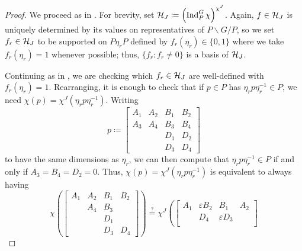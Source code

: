 \begin{proof}
	We proceed as in . For brevity, set $\mathcal{H}_J\coloneqq\left(\operatorname{Ind}_P^G\chi\right)^{\chi^J}$. Again, $f\in\mathcal{H}_J$ is uniquely determined by its values on representatives of $P\backslash G/P$, so we set $f_r\in\mathcal{H}_J$ to be supported on $P\eta_rP$ defined by $f_r(\eta_r)\in\{0,1\}$ where we take $f_r(\eta_r)=1$ whenever possible; thus, $\{f_r:f_r\ne0\}$ is a basis of $\mathcal{H}_J$.

	Continuing as in , we are checking which $f_r\in\mathcal{H}_J$ are well-defined with $f_r(\eta_r)=1$.
    Rearranging, it is enough to check that
    if $p\in P$ has $\eta_rp\eta_r^{-1}\in P$, we need $\chi(p)=\chi^J\left(\eta_rp\eta_r^{-1}\right)$. Writing
	\[p\coloneqq\begin{bmatrix}
        A_1 & A_2 & B_1 & B_2 \\
        A_3 & A_4 & B_3 & B_4 \\
            &     & D_1 & D_2 \\
            &     & D_3 & D_4
    \end{bmatrix}\]
    to have the same dimensions as $\eta_r$, we can then compute that $\eta_rp\eta_r^{-1} \in P$
    if and only if $A_3=B_4=D_2=0$. Thus, $\chi(p)=\chi^J\left(\eta_rp\eta_r^{-1}\right)$ is equivalent to always having
	\[\chi\left(\begin{bmatrix}
        A_1 & A_2 & B_1 & B_2 \\
            & A_4 & B_3 &     \\
            &     & D_1 &     \\
            &     & D_3 & D_4
    \end{bmatrix}\right)\stackrel?=\chi^J\left(\begin{bmatrix}
        A_1 & \varepsilon B_2 &  B_1 & A_2 \\
            &  D_4 & \varepsilon D_3 \\

\end{bmatrix}\]
\end{proof}
